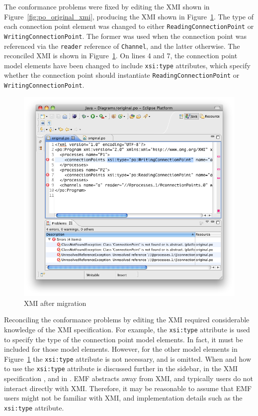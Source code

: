 The conformance problems were fixed by editing the XMI shown in Figure~\ref{fig:po_original_xmi}, producing the XMI shown in Figure~\ref{fig:po_migrated_xmi}. The type of each connection point element was changed to either \texttt{Re\-ad\-i\-ngCo\-nn\-ec\-ti\-o\-nPo\-i\-nt} or \texttt{Wr\-i\-ti\-ngCo\-nn\-ec\-ti\-o\-nPo\-i\-nt}. The former was used when the connection point was referenced via the \texttt{reader} reference of \texttt{Channel}, and the latter otherwise. The reconciled XMI is shown in Figure~\ref{fig:po_migrated_xmi}. On lines 4 and 7, the connection point model elements have been changed to include \texttt{xsi:type} attributes, which specify whether the connection point should instantiate \texttt{Re\-ad\-i\-ngCo\-nn\-ec\-ti\-o\-nPo\-i\-nt} or \texttt{Wr\-i\-ti\-ngCo\-nn\-ec\-ti\-o\-nPo\-i\-nt}.

\begin{figure}[htbp]
	\centering
	\includegraphics[width=13.5cm]{6.Evaluation/images/user_driven/po_migrated_xmi.png}
	\caption{XMI after migration}
	\label{fig:po_migrated_xmi}
\end{figure}

Reconciling the conformance problems by editing the XMI required considerable knowledge of the XMI specification. For example, the \texttt{xsi:type} attribute is used to specify the type of the connection point model elements. In fact, it must be included for those model elements. However, for the other model elements in Figure~\ref{fig:po_migrated_xmi} the \texttt{xsi:type} attribute is not necessary, and is omitted. When and how to use the \texttt{xsi:type} attribute is discussed further in the sidebar, in the XMI specification \cite{xmi}, and in \cite{steinberg09emf}. EMF abstracts away from XMI, and typically users do not interact directly with XMI. Therefore, it may be reasonable to assume that EMF users might not be familiar with XMI, and implementation details such as the \texttt{xsi:type} attribute.

